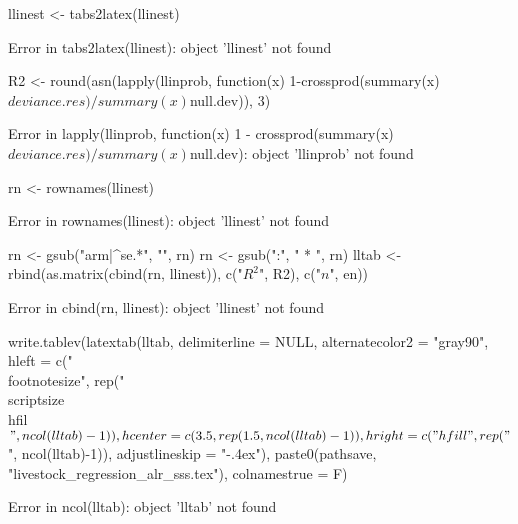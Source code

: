 \begin{Schunk}
\begin{Sinput}
llinest <- tabs2latex(llinest)
\end{Sinput}
\begin{Soutput}
Error in tabs2latex(llinest): object 'llinest' not found
\end{Soutput}
\begin{Sinput}
R2 <- round(asn(lapply(llinprob, 
	function(x) 1-crossprod(summary(x)$deviance.res)/summary(x)$null.dev)), 3)
\end{Sinput}
\begin{Soutput}
Error in lapply(llinprob, function(x) 1 - crossprod(summary(x)$deviance.res)/summary(x)$null.dev): object 'llinprob' not found
\end{Soutput}
\begin{Sinput}
rn <- rownames(llinest)
\end{Sinput}
\begin{Soutput}
Error in rownames(llinest): object 'llinest' not found
\end{Soutput}
\begin{Sinput}
rn <- gsub("arm|^se.*", "", rn)
rn <- gsub(":", " * ", rn)
lltab <- rbind(as.matrix(cbind(rn, llinest)), c("$R^{2}$", R2), 
	c("$n$", en))
\end{Sinput}
\begin{Soutput}
Error in cbind(rn, llinest): object 'llinest' not found
\end{Soutput}
\begin{Sinput}
write.tablev(latextab(lltab, delimiterline = NULL, alternatecolor2 = "gray90",
	hleft = c("\\footnotesize", rep("\\scriptsize\\hfil$", ncol(lltab)-1)),
	hcenter = c(3.5, rep(1.5, ncol(lltab)-1)), 
	hright = c("\\hfill", rep("$", ncol(lltab)-1)),
	adjustlineskip = "-.4ex"), 
	paste0(pathsave, "livestock_regression_alr_sss.tex"), colnamestrue = F)
\end{Sinput}
\begin{Soutput}
Error in ncol(lltab): object 'lltab' not found
\end{Soutput}
\end{Schunk}

